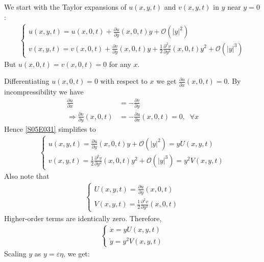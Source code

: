 \begin{solution}[6.2]
We start with the Taylor expansions of $u(x,y,t)$ and $v(x,y,t)$ in $y$ near $y=0$:
\begin{align}\label{S05E031}
	\begin{cases}
		\displaystyle u(x,y,t) = u(x,0,t) + \frac{\partial u}{\partial y}(x,0,t)y + \mathcal{O}(|y|^2) \\
		\displaystyle v(x,y,t) = v(x,0,t) + \frac{\partial v}{\partial y}(x,0,t)y + \frac{1}{2} \frac{\partial^2 v}{\partial y^2}(x,0,t)y^2 + \mathcal{O}(|y|^3)
	\end{cases}
\end{align}
But $u(x,0,t) = v(x,0,t) = 0$ for any $x$.

Differentiating $u(x,0,t) = 0$ with respect to $x$ we get $\displaystyle \frac{\partial u}{\partial x}(x,0,t) = 0$. By incompressibility we have
\begin{align}
	\frac{\partial u}{\partial x} &= - \frac{\partial v}{\partial y} \\
	\Longrightarrow \frac{\partial v}{\partial y}(x,0,t) &= - \frac{\partial u}{\partial x}(x,0,t) = 0, \;\; \forall x
\end{align}
Hence \eqref{S05E031} simplifies to
\begin{align}
	\begin{cases}
		\displaystyle u(x,y,t) = \frac{\partial u}{\partial y}(x,0,t)y + \mathcal{O}(|y|^2) = y U(x,y,t) \\
		\displaystyle v(x,y,t) = \frac{1}{2} \frac{\partial^2 v}{\partial y^2}(x,0,t)y^2 + \mathcal{O}(|y|^3) = y^2V(x,y,t)
	\end{cases}
\end{align}
Also note that
\begin{align}\label{S05E032}
	\begin{cases}
		\displaystyle U(x,y,t) = \frac{\partial u}{\partial y}(x,0,t) \\
		\displaystyle V(x,y,t) = \frac{1}{2}\frac{\partial^2 v}{\partial y^2}(x,0,t)
	\end{cases}
\end{align}
Higher-order terms are identically zero. Therefore,
\begin{align}
	\begin{cases}
		\dot{x} = yU(x,y,t) \\
		\dot{y} = y^2V(x,y,t)
	\end{cases}
\end{align}
Scaling $y$ as $y = \varepsilon \eta$, we get:
\begin{align}\label{S05E033}

\end{align}
\end{solution}
